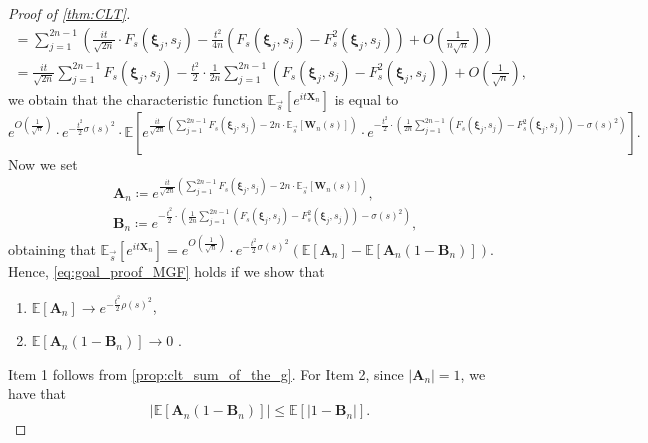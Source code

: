 \documentclass[11pt,a4paper,oneside]{article}
\theoremstyle{definition}
\theoremstyle{remark}
\def\E{\mathbb{E}}
\begin{document}
\begin{proof}[Proof of \cref{thm:CLT}]
\begin{multline}
	=  \sum_{j=1}^{2n-1} \left(\frac{it}{\sqrt{2n}}  \cdot F_s\left(\bm \xi_j,s_j \right) - \frac{t^2}{4n} \left( F_s\left(\bm \xi_j,s_j \right) - F_s^2\left(\bm \xi_j,s_j \right) \right) + O \left(\frac{1}{n\sqrt{n}} \right)\right) \\
	=  \frac{i t}{\sqrt{2n}} \sum_{j=1}^{2n-1} F_s\left(\bm \xi_j,s_j \right) - \frac{t^2}{2} \cdot  \frac{1}{2n} \sum_{j=1}^{2n-1}  \left( F_s\left(\bm \xi_j,s_j \right) - F_s^2\left(\bm \xi_j,s_j \right) \right)  + O \left(\frac{1}{\sqrt{n}} \right),
	\end{multline}
	we obtain that the characteristic function  $\E_{\vec{s}}\left[e^{it\bm X_n}\right]$ is equal to
	\begin{equation}
	e^{O\left( \frac{1}{\sqrt n} \right)} \cdot e^{-\frac{t^2}{2}\sigma(s)^2}
	\cdot \E \left[	e^{  \frac{it}{\sqrt{2n}} \left( \sum_{j=1}^{2n-1} F_s (\bm \xi_j,s_j ) - 2n \cdot  \E_{\vec{s}}[\bm W_n(s)] \right) }
	\cdot e^{-  \frac{t^2}{2} \cdot   \left(\frac{1}{2n} \sum_{j=1}^{2n-1}  \left( F_s\left(\bm \xi_j,s_j \right) - F_s^2\left(\bm \xi_j,s_j \right) \right) - \sigma(s)^2  \right) } \right].
	\end{equation}	
	Now we set
	\begin{align}
		&\bm A_n\coloneqq e^{  \frac{it}{\sqrt{2n}} \left( \sum_{j=1}^{2n-1} F_s (\bm \xi_j,s_j ) - 2n \cdot  \E_{\vec{s}}[\bm W_n(s)] \right) },\\
		&\bm B_n\coloneqq e^{-  \frac{t^2}{2} \cdot   \left(\frac{1}{2n} \sum_{j=1}^{2n-1}  \left( F_s\left(\bm \xi_j,s_j \right) - F_s^2\left(\bm \xi_j,s_j \right) \right) - \sigma(s)^2  \right) },
	\end{align}
	obtaining that $\E_{\vec{s}}\left[e^{it\bm X_n}\right]=	e^{O\left( \frac{1}{\sqrt n} \right)} \cdot e^{-\frac{t^2}{2}\sigma(s)^2}\left(\E\left[\bm A_n\right]-\E\left[\bm A_n(1-\bm B_n)\right]\right)$.
	Hence, \cref{eq:goal_proof_MGF} holds if we show that
	\begin{enumerate}
		\item $\E\left[\bm A_n\right] \to e^{-\frac{t^2}{2}  \rho(s)^2} $, \label{eq:clt_delta_small2}
		\item $\E\left[\bm A_n(1-\bm B_n)\right] \to 0 $ .\label{eq:clt_delta_big2}
	\end{enumerate}
	Item 1 follows from \cref{prop:clt_sum_of_the_g}. For Item 2, since $|\bm A_n|=1$, we have that
	\begin{equation}
		\left|\E\left[\bm A_n(1-\bm B_n)\right] \right|\leq \E\left[|1-\bm B_n|\right].
	\end{equation}

\end{proof}
\end{document}
